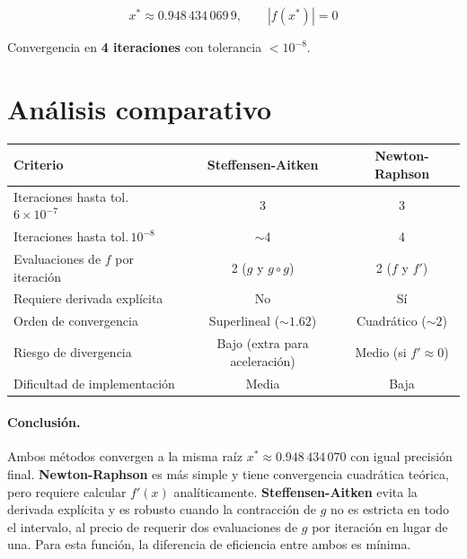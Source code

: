 \documentclass[12pt,a4paper]{article}
\begin{document}
\[
  \boxed{x^* \approx 0.948\,434\,069\,9, \qquad |f(x^*)| = 0}
\]

Convergencia en \textbf{4 iteraciones} con tolerancia $<10^{-8}$.

\section*{An\'alisis comparativo}

\begin{center}
\renewcommand{\arraystretch}{1.3}
\begin{tabular}{lcc}
\toprule
\textbf{Criterio} & \textbf{Steffensen-Aitken} & \textbf{Newton-Raphson} \\
\midrule
Iteraciones hasta tol.\,$6\times10^{-7}$ & 3 & 3 \\
Iteraciones hasta tol.\,$10^{-8}$        & $\sim$4 & 4 \\
Evaluaciones de $f$ por iteraci\'on      & 2 ($g$ y $g\circ g$) & 2 ($f$ y $f'$) \\
Requiere derivada expl\'icita            & No & S\'i \\
Orden de convergencia                    & Superlineal ($\sim1.62$) & Cuadr\'atico ($\sim2$) \\
Riesgo de divergencia                    & Bajo (extra para aceleraci\'on) & Medio (si $f'\approx0$) \\
Dificultad de implementaci\'on           & Media & Baja \\
\bottomrule
\end{tabular}
\end{center}

\paragraph{Conclusi\'on.}
Ambos m\'etodos convergen a la misma ra\'iz
$x^* \approx 0.948\,434\,070$ con igual precisi\'on final.
\textbf{Newton-Raphson} es m\'as simple y tiene convergencia cuadr\'atica
te\'orica, pero requiere calcular $f'(x)$ anal\'iticamente.
\textbf{Steffensen-Aitken} evita la derivada expl\'icita y es robusto cuando
la contracci\'on de $g$ no es estricta en todo el intervalo, al precio de
requerir dos evaluaciones de $g$ por iteraci\'on en lugar de una.
Para esta funci\'on, la diferencia de eficiencia entre ambos es m\'inima.
\end{document}
